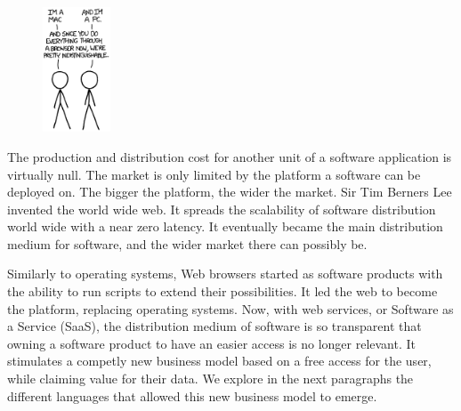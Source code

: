 \begin{figure}
  \vspace{-27pt}
  \begin{center}
    \includegraphics[width=0.18\textwidth]{../ressources/Mac-PC.png}
  \end{center}
  \vspace{-20pt}
\end{figure}

The production and distribution cost for another unit of a software application is virtually null.
The market is only limited by the platform a software can be deployed on.
The bigger the platform, the wider the market.
Sir Tim Berners Lee invented the world wide web.
It spreads the scalability of software distribution world wide with a near zero latency.
It eventually became the main distribution medium for software, and the wider market there can possibly be.

Similarly to operating systems, Web browsers started as software products with the ability to run scripts to extend their possibilities.
It led the web to become the platform, replacing operating systems.
Now, with web services, or Software as a Service (SaaS), the distribution medium of software is so transparent that owning a software product to have an easier access is no longer relevant.
It stimulates a competly new business model based on a free access for the user, while claiming value for their data.
We explore in the next paragraphs the different languages that allowed this new business model to emerge.

